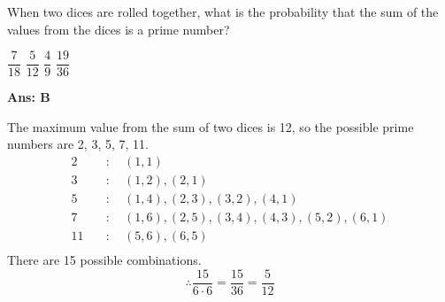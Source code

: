 \documentclass[varwidth=70mm]{standalone}
\begin{document}
When two dices are rolled together, what is the probability that the sum of the values from the dices is a prime number? 

\begin{choices}
\choice $\dfrac{7}{18}$
\choice $\dfrac{5}{12}$%
\choice $\dfrac{4}{9}$
\choice $\dfrac{19}{36}$
\end{choices}

\begin{answer}
\hrulefill\par
\textbf{Ans: B}

The maximum value from the sum of two dices is 12, so the possible prime numbers are 2, 3, 5, 7, 11. 
\begin{equation*}
\begin{aligned}
2 \quad &: \quad (1, 1) \\
3 \quad &: \quad (1, 2), (2, 1) \\
5 \quad &: \quad (1, 4), (2, 3), (3, 2), (4, 1) \\
7 \quad &: \quad (1, 6), (2, 5), (3, 4), (4, 3), (5, 2), (6, 1) \\
11 \quad &: \quad (5, 6), (6, 5) \\
\end{aligned}
\end{equation*}
There are 15 possible combinations.
\begin{equation*}
\therefore \frac{15}{6\cdot 6} = \frac{15}{36} = \frac{5}{12}
\end{equation*}

\end{answer}
\end{document}
